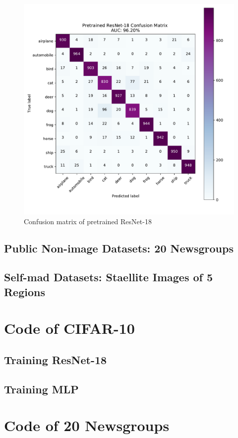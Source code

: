 \documentclass[twocolumn]{extarticle}
\begin{document}
\begin{appendices}
\begin{figure}[H]
\centering
\includegraphics[width=0.9\linewidth]{"charts/resnet-cifar-conf"}
\caption{Confusion matrix of pretrained ResNet-18}
\label{fig:resnet-cifar-conf}
\end{figure}

\subsection{Public Non-image Datasets: 20 Newsgroups}

\subsection{Self-mad Datasets: Staellite Images of 5 Regions}

\section{Code of CIFAR-10}
\subsection{Training ResNet-18}
\subsection{Training MLP}
\section{Code of 20 Newsgroups}

\end{appendices}
\end{document}
